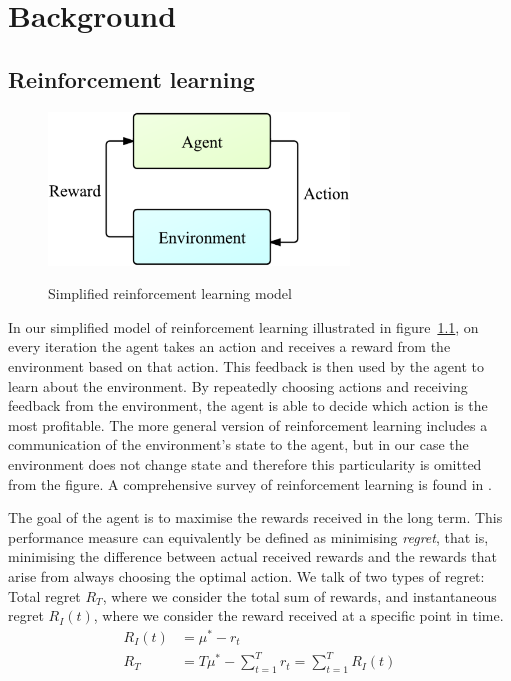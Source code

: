 \chapter{Background}
\label{ch:background}

\section{Reinforcement learning}
\begin{figure}[htbp]
    \centering
    \includegraphics[width=8cm]{images/ReinforcementLearning}
    \label{fig:rlearn}
    \caption{Simplified reinforcement learning model}
\end{figure}

In our simplified model of reinforcement learning illustrated in figure~\ref{fig:rlearn}, on every iteration the agent takes an action and receives a reward from the environment based on that action.
This feedback is then used by the agent to learn about the environment.
By repeatedly choosing actions and receiving feedback from the environment, the agent is able to decide which action is the most profitable.
The more general version of reinforcement learning includes a communication of the environment's state to the agent, but in our case the environment does not change state and therefore this particularity is omitted from the figure.
A comprehensive survey of reinforcement learning is found in \cite{Kaelbling1996}.

The goal of the agent is to maximise the rewards received in the long term.
This performance measure can equivalently be defined as minimising \emph{regret}, that is, minimising the difference between actual received rewards and the rewards that arise from always choosing the optimal action.
We talk of two types of regret:
Total regret $R_T$, where we consider the total sum of rewards, and instantaneous regret $R_I(t)$, where we consider the reward received at a specific point in time.
\begin{align*}
    R_I(t) &= \mu^* - r_t \\
    R_T &= T\mu^* - \sum_{t=1}^{T}{r_t} = \sum_{t = 1}^{T}{R_I(t)} 
\end{align*}

